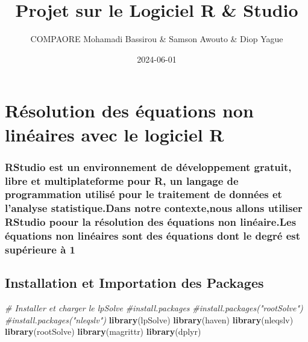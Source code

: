 \documentclass[
]{article}
\title{Projet sur le Logiciel R \& Studio}
\author{COMPAORE Mohamadi Bassirou \& Samson Awouto \& Diop Yague}
\date{2024-06-01}
\newenvironment{Shaded}{\begin{snugshade}}{\end{snugshade}}
\newcommand{\CommentTok}[1]{\textcolor[rgb]{0.56,0.35,0.01}{\textit{#1}}}
\newcommand{\FunctionTok}[1]{\textcolor[rgb]{0.13,0.29,0.53}{\textbf{#1}}}
\newcommand{\NormalTok}[1]{#1}
\begin{document}
\maketitle

{
\setcounter{tocdepth}{3}
\tableofcontents
}
\hypertarget{ruxe9solution-des-uxe9quations-non-linuxe9aires-avec-le-logiciel-r}{%
\section{Résolution des équations non linéaires avec le logiciel
R}\label{ruxe9solution-des-uxe9quations-non-linuxe9aires-avec-le-logiciel-r}}

\hypertarget{rstudio-est-un-environnement-de-duxe9veloppement-gratuit-libre-et-multiplateforme-pour-r-un-langage-de-programmation-utilisuxe9-pour-le-traitement-de-donnuxe9es-et-lanalyse-statistique.dans-notre-contextenous-allons-utiliser-rstudio-poour-la-ruxe9solution-des-uxe9quations-non-linuxe9aire.les-uxe9quations-non-linuxe9aires-sont-des-uxe9quations-dont-le-degruxe9-est-supuxe9rieure-uxe0-1}{%
\subsubsection{RStudio est un environnement de développement gratuit,
libre et multiplateforme pour R, un langage de programmation utilisé
pour le traitement de données et l'analyse statistique.Dans notre
contexte,nous allons utiliser RStudio poour la résolution des équations
non linéaire.Les équations non linéaires sont des équations dont le
degré est supérieure à
1}\label{rstudio-est-un-environnement-de-duxe9veloppement-gratuit-libre-et-multiplateforme-pour-r-un-langage-de-programmation-utilisuxe9-pour-le-traitement-de-donnuxe9es-et-lanalyse-statistique.dans-notre-contextenous-allons-utiliser-rstudio-poour-la-ruxe9solution-des-uxe9quations-non-linuxe9aire.les-uxe9quations-non-linuxe9aires-sont-des-uxe9quations-dont-le-degruxe9-est-supuxe9rieure-uxe0-1}}

\hypertarget{installation-et-importation-des-packages}{%
\subsection{Installation et Importation des
Packages}\label{installation-et-importation-des-packages}}

\begin{Shaded}
\begin{Highlighting}[]
\CommentTok{\# Installer et charger le  lpSolve}
\CommentTok{\#install.packages}
\CommentTok{\#install.packages("rootSolve")}
\CommentTok{\#install.packages("nleqslv")}
\FunctionTok{library}\NormalTok{(lpSolve)}
\FunctionTok{library}\NormalTok{(haven)}
\FunctionTok{library}\NormalTok{(nleqslv)}
\FunctionTok{library}\NormalTok{(rootSolve)}
\FunctionTok{library}\NormalTok{(magrittr)}
\FunctionTok{library}\NormalTok{(dplyr)}
\end{Highlighting}
\end{Shaded}
\end{document}
